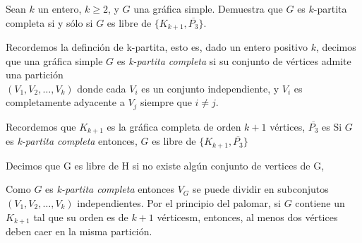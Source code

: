 Sean $k$ un entero, $k \ge 2$, y $G$ una gráfica simple. Demuestra que $G$ es $k$-partita completa si y sólo si $G$ es libre de $\{K _{k+1}, \overline{P_3}\}$.

Recordemos la definción de k-partita, esto es, dado un entero positivo $k$, decimos que una gráfica simple $G$ es \textit{k-partita completa} si su conjunto de vértices admite una partición \\$(V_1, V_2,\dots, V_k)$ donde cada $V_i$ es un conjunto independiente, y $V_i$ es completamente adyacente a $V_j$ siempre que $i \neq j$.

Recordemos que $K_{k+1}$ es la gráfica completa de orden $k+1$ vértices, $\overline{P_3}$ es 
Si $G$ es \textit{k-partita completa} entonces, $G$ es libre de $\{K_{k+1},\overline{P_3}\}$

Decimos que G es libre de H si no existe algún conjunto de vertices de G,

Como $G$ es \textit{k-partita completa} entonces $V_G$ se puede dividir en subconjutos $(V_1, V_2,\dots, V_k)$ independientes.
Por el principio del palomar, si $G$ contiene un $K_{k+1}$ tal que su orden es de $k+1$ vérticesm, entonces, al menos dos vértices deben caer en la misma partición.